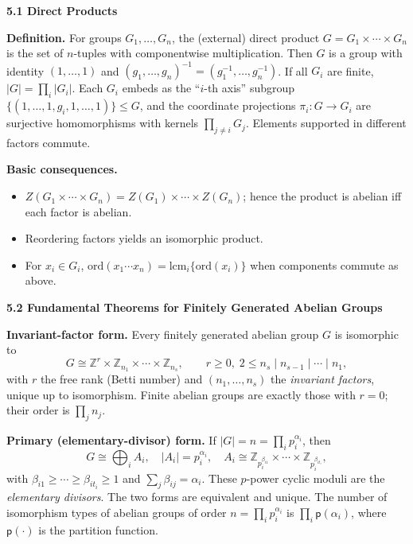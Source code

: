 \documentclass[11pt]{article}
\theoremstyle{definition}
\begin{document}
\newpage

\textbf{5.1 Direct Products}

\newpage

\textbf{Definition.} For groups $G_1,\dots,G_n$, the (external) direct product
$G = G_1\times\cdots\times G_n$ is the set of $n$-tuples with componentwise
multiplication. Then $G$ is a group with identity $(1,\dots,1)$ and
$(g_1,\dots,g_n)^{-1}=(g_1^{-1},\dots,g_n^{-1})$. If all $G_i$ are finite,
$|G|=\prod_i |G_i|$. Each $G_i$ embeds as the ``$i$-th axis'' subgroup
$\{(1,\dots,1,g_i,1,\dots,1)\}\le G$, and the coordinate projections
$\pi_i:G\to G_i$ are surjective homomorphisms with kernels
$\prod_{j\neq i} G_j$. Elements supported in different factors commute. 

\medskip
\textbf{Basic consequences.}
\begin{itemize}\itemsep4pt
  \item $Z(G_1\times\cdots\times G_n)=Z(G_1)\times\cdots\times Z(G_n)$; hence the product is abelian iff each factor is abelian.
  \item Reordering factors yields an isomorphic product.
  \item For $x_i\in G_i$, $\mathrm{ord}(x_1\cdots x_n)=\mathrm{lcm}_i\{\mathrm{ord}(x_i)\}$ when components commute as above.
\end{itemize}

\newpage

\textbf{5.2 Fundamental Theorems for Finitely Generated Abelian Groups}

\newpage

\textbf{Invariant-factor form.} Every finitely generated abelian group $G$ is
isomorphic to
\[
G \cong \mathbb{Z}^r \times \mathbb{Z}_{n_1}\times \cdots \times \mathbb{Z}_{n_s},
\qquad r\ge 0,\; 2\le n_s\mid n_{s-1}\mid \cdots \mid n_1,
\]
with $r$ the free rank (Betti number) and $(n_1,\dots,n_s)$ the \emph{invariant factors}, unique up to isomorphism. Finite abelian groups are exactly those with $r=0$; their order is $\prod_j n_j$.

\medskip
\textbf{Primary (elementary-divisor) form.} If $|G|=n=\prod_i p_i^{\alpha_i}$, then
\[
G \cong \bigoplus_i A_i, \quad |A_i|=p_i^{\alpha_i}, \quad
A_i \cong \mathbb{Z}_{p_i^{\beta_{i1}}}\times \cdots \times \mathbb{Z}_{p_i^{\beta_{it_i}}},
\]
with $\beta_{i1}\ge \cdots \ge \beta_{it_i}\ge 1$ and $\sum_j \beta_{ij}=\alpha_i$.
These $p$-power cyclic moduli are the \emph{elementary divisors}. The two forms are equivalent and unique. The number of isomorphism types of abelian groups of order $n=\prod_i p_i^{\alpha_i}$ is $\prod_i \mathsf{p}(\alpha_i)$, where $\mathsf{p}(\cdot)$ is the partition function.
\end{document}
